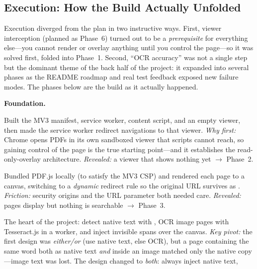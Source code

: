 \subsection{Execution: How the Build Actually Unfolded}
Execution diverged from the plan in two instructive ways. First, viewer
interception (planned as Phase~6) turned out to be a \emph{prerequisite} for
everything else---you cannot render or overlay anything until you control the
page---so it was solved first, folded into Phase~1. Second, ``OCR accuracy''
was not a single step but the dominant theme of the back half of the project: it
expanded into several phases as the README roadmap and real test feedback
exposed new failure modes. The phases below are the build as it actually
happened.

\medskip
\noindent\textbf{Foundation.}
\begin{description}[leftmargin=1.4em, style=nextline, itemsep=4pt]
  \item[Phase 1 --- Extension skeleton \& PDF interception.] Built the MV3
        manifest, service worker, content script, and an empty viewer, then made
        the service worker redirect  navigations to that viewer.
        \emph{Why first:} Chrome opens PDFs in its own sandboxed viewer that
        scripts cannot reach, so gaining control of the page is the true
        starting point---and it establishes the read-only-overlay architecture.
        \emph{Revealed:} a viewer that shows nothing yet $\rightarrow$ Phase~2.
  \item[Phase 2 --- PDF.js rendering pipeline.] Bundled PDF.js locally (to satisfy
        the MV3 CSP) and rendered each page to a canvas, switching to a
        \emph{dynamic} redirect rule so the original URL survives as
        . \emph{Friction:}  security origins and the
         URL parameter both needed care. \emph{Revealed:} pages
        display but nothing is searchable $\rightarrow$ Phase~3.
  \item[Phase 3 --- Text detection, OCR \& the invisible overlay.] The heart of
        the project: detect native text with , OCR image
        pages with Tesseract.js in a worker, and inject invisible spans over the
        canvas. \emph{Key pivot:} the first design was \emph{either/or} (use
        native text, else OCR), but a page containing the same word both as native
        text \emph{and} inside an image matched only the native copy---image text
        was lost. The design changed to \emph{both}: always inject native text,

\end{description}

